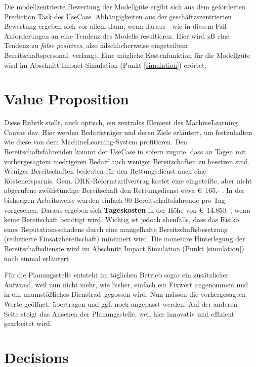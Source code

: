 Die modellzentrierte Bewertung der Modellgüte ergibt sich aus dem geforderten Prediction Task des UseCase. Abhängigkeiten aus der geschäftzszentrierten Bewertung ergeben sich vor allem dann, wenn daraus - wie in diesem Fall - Anforderungen an eine Tendenz des Modells resultieren. Hier wird zB eine Tendenz zu \textit{false positives}, also fälschlicherweise eingeteiltem  Bereitschaftspersonal, verlangt. Eine mögliche Kostenfunktion für die Modellgüte wird im Abschnitt Impact Simulation (Punkt \ref{simulation}) erörtet.

\section{Value Proposition}
\label{value}
Diese Rubrik stellt, auch optisch, ein zentrales Element des MachineLearning Canvas dar. Hier werden Bedarfsträger und deren Ziele erläutert, um festzuhalten wie diese von dem MachineLearning-System profitieren. Den Bereitschaftsfahrenden kommt der UseCase in sofern zugute, dass an Tagen mit vorhergesagtem niedrigeren Bedarf auch weniger Bereitschaften zu besetzen sind. Weniger Bereitschaften bedeuten für den Rettungsdienst auch eine Kostenersparnis. Gem. DRK-Reformtarifvertrag kostet eine eingeteilte, aber nicht abgerufene zwölfstündige Bereitschaft den Rettungsdienst etwa €~165,- \citep{deutsches_rotes_kreuz_drk-reformtarifvertrag_2023}. In der bisherigen Arbeitsweise wurden einfach 90 Bereitschaftsfahrende pro Tag vorgesehen. Daraus ergeben sich \textbf{Tageskosten} in der Höhe von €~14.850,-, wenn keine Bereitschaft benötigt wird. Wichtig ist jedoch ebenfalls, dass das Risiko eines Reputationsschadens durch eine mangelhafte Bereitschaftsbesetzung (reduzierte Einsatzbereitschaft) minimiert wird. Die monetäre Hinterlegung der Bereitschaftsdienste wird im Abschnitt Impact Simulation (Punkt \ref{simulation}) noch einmal erläutert.

Für die Planungsstelle entsteht im täglichen Betrieb sogar ein zusätzlicher Aufwand, weil nun nicht mehr, wie bisher, einfach ein Fixwert angenommen und in ein unumstößliches \glqq Dienstrad\grqq\ gegossen wird. Nun müssen die vorhergesagten Werte geöffnet, übertragen und ggf. noch angepasst werden. Auf der anderen Seite steigt das Ansehen der Planungsstelle, weil hier innovativ und effizient gearbeitet wird.

\section{Decisions}

